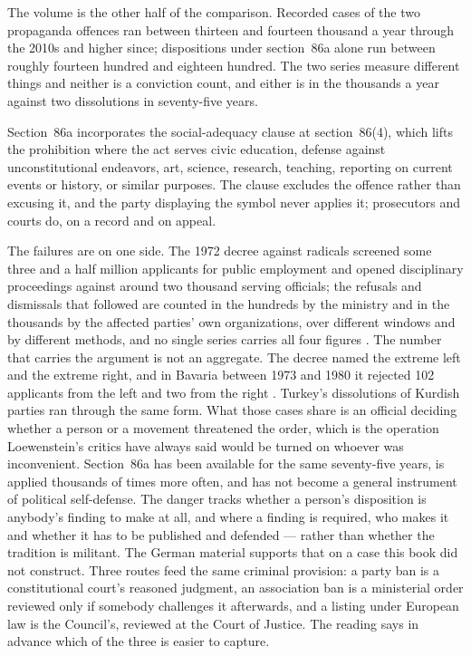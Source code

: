 The volume is the other half of the comparison. Recorded cases of the two propaganda offences ran between thirteen and fourteen thousand a year through the 2010s and higher since; dispositions under section~86a alone run between roughly fourteen hundred and eighteen hundred. The two series measure different things and neither is a conviction count, and either is in the thousands a year against two dissolutions in seventy-five years.

Section~86a incorporates the social-adequacy clause at section~86(4), which lifts the prohibition where the act serves civic education, defense against unconstitutional endeavors, art, science, research, teaching, reporting on current events or history, or similar purposes. The clause excludes the offence rather than excusing it, and the party displaying the symbol never applies it; prosecutors and courts do, on a record and on appeal.

The failures are on one side. The 1972 decree against radicals screened some three and a half million applicants for public employment and opened disciplinary proceedings against around two thousand serving officials; the refusals and dismissals that followed are counted in the hundreds by the ministry and in the thousands by the affected parties' own organizations, over different windows and by different methods, and no single series carries all four figures \autocite{braunthal1990political}. The number that carries the argument is not an aggregate.
The decree named the extreme left and the extreme right, and in Bavaria between 1973 and 1980 it rejected 102 applicants from the left and two from the right \autocite{muehldorfer2014radikalenerlass}. Turkey's dissolutions of Kurdish parties ran through the same form. What those cases share is an official deciding whether a person or a movement threatened the order, which is the operation Loewenstein's critics have always said would be turned on whoever was inconvenient. Section~86a has been available for the same seventy-five years, is applied thousands of times more often, and has not become a general instrument of political self-defense. The danger tracks whether a person's disposition is anybody's finding to make at all, and where a finding is required, who makes it and whether it has to be published and defended — rather than whether the tradition is militant. The German material supports that on a case this book did not construct. Three routes feed the same criminal provision: a party ban is a constitutional court's reasoned judgment, an association ban is a ministerial order reviewed only if somebody challenges it afterwards, and a listing under European law is the Council's, reviewed at the Court of Justice. The reading says in advance which of the three is easier to capture.

